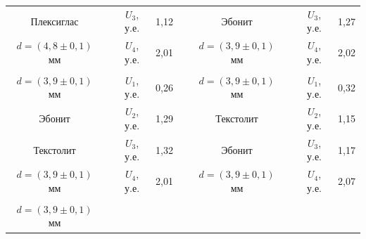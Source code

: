 \documentclass[a4paper,12pt]{article} %
\begin{document}
\begin{table}[H]
\begin{tabular}{ccccccccc}
		\multicolumn{1}{|c|}{Плексиглас} &
		\multicolumn{1}{c|}{} &
		\multicolumn{1}{c|}{$U_3$, у.е.} &
		\multicolumn{1}{c|}{1,12} &
		\multicolumn{1}{c|}{} &
		\multicolumn{1}{c|}{Эбонит} &
		\multicolumn{1}{c|}{} &
		\multicolumn{1}{c|}{$U_3$, у.е.} &
		\multicolumn{1}{c|}{1,27} \\ \cline{1-1} \cline{3-4} \cline{6-6} \cline{8-9} 
		\multicolumn{1}{|c|}{$d = (4,8 \pm 0,1)$ мм} &
		\multicolumn{1}{c|}{} &
		\multicolumn{1}{c|}{$U_4$, у.е.} &
		\multicolumn{1}{c|}{2,01} &
		\multicolumn{1}{c|}{} &
		\multicolumn{1}{c|}{$d = (3,9 \pm 0,1)$ мм} &
		\multicolumn{1}{c|}{} &
		\multicolumn{1}{c|}{$U_4$, у.е.} &
		\multicolumn{1}{c|}{2,02} \\ \cline{1-1} \cline{3-4} \cline{6-6} \cline{8-9} 
		&
		&
		&
		&
		&
		&
		&
		&
		\\ \cline{1-1} \cline{3-4} \cline{6-6} \cline{8-9} 
		\multicolumn{1}{|c|}{$d = (3,9 \pm 0,1)$ мм} &
		\multicolumn{1}{c|}{} &
		\multicolumn{1}{c|}{$U_1$, у.е.} &
		\multicolumn{1}{c|}{0,26} &
		\multicolumn{1}{c|}{} &
		\multicolumn{1}{c|}{$d = (3,9 \pm 0,1)$ мм} &
		\multicolumn{1}{c|}{} &
		\multicolumn{1}{c|}{$U_1$, у.е.} &
		\multicolumn{1}{c|}{0,32} \\ \cline{1-1} \cline{3-4} \cline{6-6} \cline{8-9} 
		\multicolumn{1}{|c|}{Эбонит} &
		\multicolumn{1}{c|}{} &
		\multicolumn{1}{c|}{$U_2$, у.е.} &
		\multicolumn{1}{c|}{1,29} &
		\multicolumn{1}{c|}{} &
		\multicolumn{1}{c|}{Текстолит} &
		\multicolumn{1}{c|}{} &
		\multicolumn{1}{c|}{$U_2$, у.е.} &
		\multicolumn{1}{c|}{1,15} \\ \cline{1-1} \cline{3-4} \cline{6-6} \cline{8-9} 
		\multicolumn{1}{|c|}{Текстолит} &
		\multicolumn{1}{c|}{} &
		\multicolumn{1}{c|}{$U_3$, у.е.} &
		\multicolumn{1}{c|}{1,32} &
		\multicolumn{1}{c|}{} &
		\multicolumn{1}{c|}{Эбонит} &
		\multicolumn{1}{c|}{} &
		\multicolumn{1}{c|}{$U_3$, у.е.} &
		\multicolumn{1}{c|}{1,17} \\ \cline{1-1} \cline{3-4} \cline{6-6} \cline{8-9} 
		\multicolumn{1}{|c|}{$d = (3,9 \pm 0,1)$ мм} &
		\multicolumn{1}{c|}{} &
		\multicolumn{1}{c|}{$U_4$, у.е.} &
		\multicolumn{1}{c|}{2,01} &
		\multicolumn{1}{c|}{} &
		\multicolumn{1}{c|}{$d = (3,9 \pm 0,1)$ мм} &
		\multicolumn{1}{c|}{} &
		\multicolumn{1}{c|}{$U_4$, у.е.} &
		\multicolumn{1}{c|}{2,07} \\ \cline{1-1} \cline{3-4} \cline{6-6} \cline{8-9} 
		&
		&
		&
		&
		&
		&
		&
		&
		\\ \cline{1-1} \cline{3-4} \cline{6-6} \cline{8-9} 
		\multicolumn{1}{|c|}{$d = (3,9 \pm 0,1)$ мм} &

\end{tabular}
\end{table}
\end{document}
